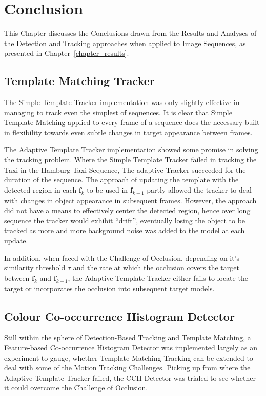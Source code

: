 \chapter{Conclusion}
This Chapter discusses the Conclusions drawn from the Results
and Analyses of the Detection and Tracking approaches when applied to Image
Sequences, as presented in Chapter~\ref{chapter_results}.

\section{Template Matching Tracker}
The Simple Template Tracker implementation was only slightly effective in
managing to track even the simplest of sequences. It is clear that Simple Template
Matching applied to every frame of a sequence does the necessary built-in
flexibility towards even subtle changes in target appearance between frames.

The Adaptive Template Tracker implementation showed some promise in solving the
tracking problem. Where the Simple Template Tracker failed in tracking the
Taxi in the Hamburg Taxi Sequence, The adaptive Tracker succeeded for the
duration of the sequence. 
The approach of updating the template with the detected region in each
$\mathbf{f}_k$ to be used in $\mathbf{f}_{k+1}$ partly allowed the tracker to
deal with changes in object appearance in subsequent frames. However, the
approach did not have a means to effectively center the detected region, hence
over long sequence the tracker would exhibit ``drift'', eventually losing the
object to be tracked as more and more background noise was added to the model at
each update.

In addition, when faced with the Challenge of Occlusion, depending on it's
similarity threshold $\tau$ and the rate at which the occlusion covers the
target between $\mathbf{f}_k$ and $\mathbf{f}_{k+1}$, the Adaptive Template
Tracker either fails to locate the target or incorporates the occlusion into
subsequent target models.

\section{Colour Co-occurrence Histogram Detector}
Still within the sphere of Detection-Based Tracking and Template Matching, a
Feature-based Co-occurrence Histogram Detector was implemented largely as an
experiment to gauge, whether Template Matching Tracking can be extended to deal
with some of the Motion Tracking Challenges. 
Picking up from where the Adaptive Template Tracker failed, the CCH Detector was
trialed to see whether it could overcome the Challenge of Occlusion.

